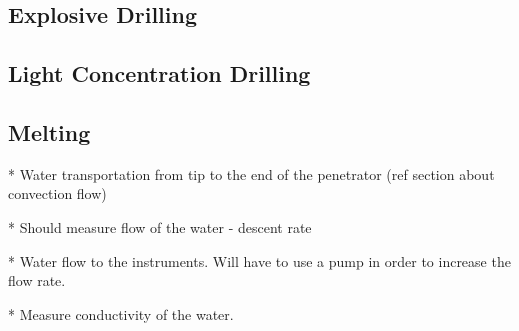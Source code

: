 \subsection{Explosive Drilling}





\subsection{Light Concentration Drilling}

\subsection{Melting}

* Water transportation from tip to the end of the penetrator (ref section about convection flow)

* Should measure flow of the water - descent rate

* Water flow to the instruments. Will have to use a pump in order to increase the flow rate.

* Measure conductivity of the water.





